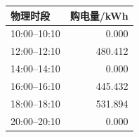 \begin{tabular}{lr}
\toprule
物理时段 & 购电量/kWh \\
\midrule
10:00--10:10 & 0.000 \\
12:00--12:10 & 480.412 \\
14:00--14:10 & 0.000 \\
16:00--16:10 & 445.432 \\
18:00--18:10 & 531.894 \\
20:00--20:10 & 0.000 \\
\bottomrule
\end{tabular}
